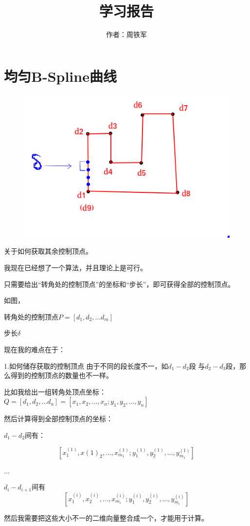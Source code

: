 \documentclass[12pt,a4paper]{article}
\title{学习报告}
\author{作者：周铁军}
\date{\chntoday}
\begin{document}
\maketitle
\newpage


\section{均匀B-Spline曲线}
\begin{figure}[ht]
	\centering
	\includegraphics[scale=0.6]{./figures/1.png}
	\caption{}
	\label{fig:label}	
\end{figure}

关于如何获取其余控制顶点。

我现在已经想了一个算法，并且理论上是可行。

只需要给出“转角处的控制顶点”的坐标和“步长”，即可获得全部的控制顶点。

如图，

转角处的控制顶点$P=[d_1,d_2,...d_m]$

步长$\delta$
     
现在我的难点在于：

1.如何储存获取的控制顶点
由于不同的段长度不一，如$d_1 - d_2$段 与$d_2-d_3$段，那么得到的控制顶点的数量也不一样。

比如我给出一组转角处顶点坐标：
$Q=[d_1,d_2,...d_n] =[x_1,x_2,...,x_n; y_1,y_2,...,y_n]$

然后计算得到全部控制顶点的坐标：

$d_1 - d_2$间有：

$$[x^{(1)}_1,x{(1)}_2,...,x^{(1)}_{m_1}; y^{(1)}_1,y^{(1)}_2,...,y^{(1)}_{m_1}]$$

...

$d_i - d_{i+1}$间有
$$[x^{(i)}_1,x^{(i)}_2,...,x^{(i)}_{m_i}; y^{(i)}_1,y^{(i)}_2,...,y^{(i)}_{m_i}]$$

然后我需要把这些大小不一的二维向量整合成一个，才能用于计算。
\end{document}
